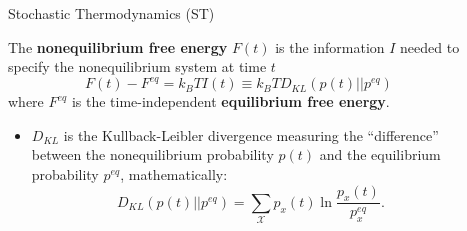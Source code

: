 \documentclass[final]{beamer}
\newlength{\sepwidth}
\newlength{\colwidth}
\newcommand{\separatorcolumn}{\begin{column}{\sepwidth}\end{column}}
\begin{document}
\begin{frame}[t]
\begin{columns}[t]
\begin{column}{\colwidth}
\begin{block}{Stochastic Thermodynamics (ST)}
\begin{itemize}
\end{itemize}

The {\bf nonequilibrium free energy} ${F}(t)$ is the information $I$ needed to specify the nonequilibrium system at time $t$\cite{Esposito_2011}
%
\begin{equation}
{F}(t) - {F}^{eq} = k_B TI(t) \equiv k_B TD_{KL}(p(t) || p^{eq})
\label{eq noneq free energy}
\end{equation}
%
where ${F}^{eq}$ is the time-independent {\bf equilibrium free energy}.
\begin{itemize}
\justifying
\item $D_{KL}$ is the Kullback-Leibler divergence measuring the ``difference'' between the nonequilibrium probability $p(t)$ and the equilibrium probability $p^{eq}$, mathematically:
%
\begin{equation*}
D_{KL}(p(t) || p^{eq}) = \sum_{\mathcal{X}} p_x(t) \ln \frac{p_x(t)}{p_x^{eq}}.
\end{equation*}
\end{itemize}
\end{block}
\end{column}

\separatorcolumn

\begin{column}{\colwidth}


\end{column}
\end{columns}
\end{frame}
\end{document}
